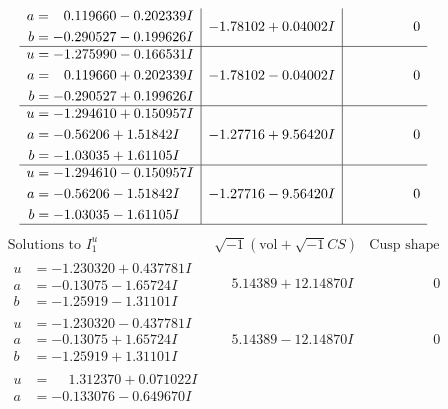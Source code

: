 \documentclass[1p]{elsarticle_modified}
\theoremstyle{definition}
\newcommand{\I}{\sqrt{-1}}
\begin{document}
$$\begin{array}{c|c|c}
\begin{aligned}
a &= \phantom{-}0.119660 - 0.202339 I \\
b &= -0.290527 - 0.199626 I\end{aligned}
 & -1.78102 + 0.04002 I & \phantom{-0.000000 } 0 \\ \hline\begin{aligned}
u &= -1.275990 - 0.166531 I \\
a &= \phantom{-}0.119660 + 0.202339 I \\
b &= -0.290527 + 0.199626 I\end{aligned}
 & -1.78102 - 0.04002 I & \phantom{-0.000000 } 0 \\ \hline\begin{aligned}
u &= -1.294610 + 0.150957 I \\
a &= -0.56206 + 1.51842 I \\
b &= -1.03035 + 1.61105 I\end{aligned}
 & -1.27716 + 9.56420 I & \phantom{-0.000000 } 0 \\ \hline\begin{aligned}
u &= -1.294610 - 0.150957 I \\
a &= -0.56206 - 1.51842 I \\
b &= -1.03035 - 1.61105 I\end{aligned}
 & -1.27716 - 9.56420 I & \phantom{-0.000000 } 0\\
 \hline 
 \end{array}$$\newpage$$\begin{array}{c|c|c}  
\text{Solutions to }I^u_{1}& \I (\text{vol} + \sqrt{-1}CS) & \text{Cusp shape}\\
 \hline 
\begin{aligned}
u &= -1.230320 + 0.437781 I \\
a &= -0.13075 - 1.65724 I \\
b &= -1.25919 - 1.31101 I\end{aligned}
 & \phantom{-}5.14389 + 12.14870 I & \phantom{-0.000000 } 0 \\ \hline\begin{aligned}
u &= -1.230320 - 0.437781 I \\
a &= -0.13075 + 1.65724 I \\
b &= -1.25919 + 1.31101 I\end{aligned}
 & \phantom{-}5.14389 - 12.14870 I & \phantom{-0.000000 } 0 \\ \hline\begin{aligned}
u &= \phantom{-}1.312370 + 0.071022 I \\
a &= -0.133076 - 0.649670 I \\

\end{aligned}
\end{array}$$
\end{document}

